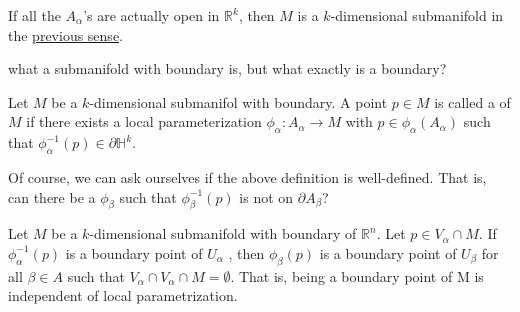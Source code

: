 \documentclass[notoc,notitlepage]{tufte-book}
\begin{document}
\begin{remark}
  If all the $A_\alpha$'s are actually open in $\mathbb{R}^k$, then $M$ is a
  $k$-dimensional submanifold in the \hyperref[defn:submanifolds]{previous
  sense}.
\end{remark}

 what a submanifold with boundary is, but what exactly is a
boundary?

\begin{defn}\label{defn:boundary_point_on_a_submanifold}
  Let $M$ be a $k$-dimensional submanifol with boundary. A point $p \in M$ is
  called a  of $M$ if there exists a local
  parameterization $\phi_\alpha : A_\alpha \to M$ with $p \in
  \phi_\alpha(A_\alpha)$ such that $\phi_\alpha^{-1} (p) \in \partial
  \mathbb{H}^k$.
\end{defn}

Of course, we can ask ourselves if the above definition is well-defined. That
is, can there be a $\phi_\beta$ such that $\phi_\beta^{-1}(p)$ is not on
$\partial A_\beta$?

\begin{propo}\label{propo:well_definedness_of_the_boundary_of_a_manifold}
  Let $M$ be a $k$-dimensional submanifold with boundary of $\mathbb{R}^n$. Let $p
  \in V_\alpha \cap M$. If $\phi_{\alpha}^{-1} (p)$ is a boundary point of
  $U_\alpha$ , then $\phi_\beta(p)$ is a boundary point of $U_{\beta}$ for all
  $\beta \in A$ such that $V_\alpha \cap V_\alpha \cap M = \emptyset$. That is,
  being a boundary point of M is independent of local parametrization.
\end{propo}
\end{document}
